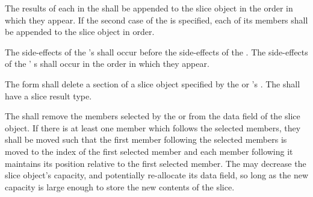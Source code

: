\specsubsubitem
The results of each  in the 
shall be appended to the slice object in the order in which they appear. If the
second case of the  is specified, each of its members
shall be appended to the slice object in order.

\specsubsubitem
The side-effects of the 's  shall occur
before the side-effects of the . The
side-effects of the ' s shall
occur in the order in which they appear.

\specsubsubitem
The  form shall delete a section of a slice object specified by
the  or 's
. The  shall
have a slice result type.

\specsubsubitem
The  shall remove the members selected by the
 or  from the
data field of the slice object. If there is at least one member which follows
the selected members, they shall be moved such that the first member following
the selected members is moved to the index of the first selected member and each
member following it maintains its position relative to the first selected
member. The  may decrease the slice object's capacity, and
potentially re-allocate its data field, so long as the new capacity is large
enough to store the new contents of the slice.


\begin{grammar}
 \\
	 \terminal{(}  \terminal{)} \\
	 \terminal{(}  \terminal{,}  \terminal{)} \\
	  \terminal{(}  \terminal{)} \\
	  \terminal{(}  \terminal{,}  \terminal{)} \\
	 \terminal{(}  \terminal{)} \\
\end{grammar}

